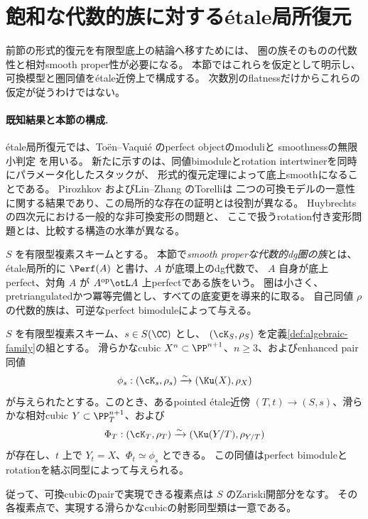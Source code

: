 \section{飽和な代数的族に対するétale局所復元}\label{sec:algebraization}

前節の形式的復元を有限型底上の結論へ移すためには、
圏の族そのものの代数性と相対smooth proper性が必要になる。
本節ではこれらを仮定として明示し、
可換模型と圏同値をétale近傍上で構成する。
次数別のflatnessだけからこれらの仮定が従うわけではない。

\paragraph{既知結果と本節の構成.}
étale局所復元では、Toën--Vaquié \cite{TV} のperfect objectのmoduliと
smoothnessの無限小判定 \cite{Stacks} を用いる。
新たに示すのは、同値bimoduleとrotation intertwinerを同時にパラメータ化したスタックが、
形式的復元定理によって底上smoothになることである。
Pirozhkov \cite{Pirozhkov} およびLin--Zhang \cite{LZ} のTorelliは
二つの可換モデルの一意性に関する結果であり、この局所的な存在の証明とは役割が異なる。
Huybrechts \cite[Section 9]{HuyUpdate} の四次元における一般的な非可換変形の問題と、
ここで扱うrotation付き変形問題とは、比較する構造の水準が異なる。

\begin{definition}\label{def:algebraic-family}
 \(S\) を有限型複素スキームとする。
 本節で\emph{smooth properな代数的dg圏の族}とは、
 étale局所的に \(\Perf(A)\) と書け、\(A\) が底環上のdg代数で、
 \(A\) 自身が底上perfect、対角 \(A\) が \(A^{\mathrm{op}}\otL A\) 上perfectである族をいう。
 圏は小さく、pretriangulatedかつ冪等完備とし、すべての底変更を導来的に取る。
 自己同値 \(\rho\) の代数的族は、可逆なperfect bimoduleによって与える。
\end{definition}

\begin{theorem}[étale局所的な可換復元]\label{thm:etale}
 \(S\) を有限型複素スキーム、\(s\in S(\CC)\) とし、
 \((\cK_S,\rho_S)\) を定義\ref{def:algebraic-family}の組とする。
 滑らかなcubic \(X^n\subset\PP^{n+1}\)、\(n\ge3\)、およびenhanced pair同値
 \[
 \phi_s:(\cK_s,\rho_s)\xrightarrow{\sim}(\Ku(X),\rho_X)
 \]
 が与えられたとする。このとき、あるpointed étale近傍
 \((T,t)\to(S,s)\)、滑らかな相対cubic \(Y\subset\PP^{n+1}_T\)、および
 \[
 \Phi_T:(\cK_T,\rho_T)\xrightarrow{\sim}(\Ku(Y/T),\rho_{Y/T})
 \]
 が存在し、\(t\) 上で \(Y_t=X\)、\(\Phi_t\simeq\phi_s\) とできる。
 この同値はperfect bimoduleとrotationを結ぶ同型によって与えられる。

 従って、可換cubicのpairで実現できる複素点は \(S\) のZariski開部分をなす。
 その各複素点で、実現する滑らかなcubicの射影同型類は一意である。
\end{theorem}

